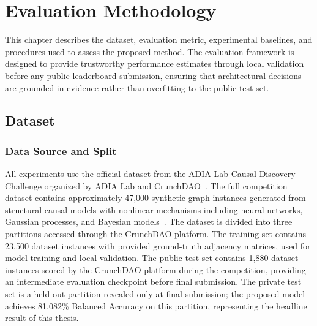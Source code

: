 \chapter{Evaluation Methodology}
\label{chap:eval}

This chapter describes the dataset, evaluation metric, experimental baselines, and procedures used to assess the proposed method. The evaluation framework is designed to provide trustworthy performance estimates through local validation before any public leaderboard submission, ensuring that architectural decisions are grounded in evidence rather than overfitting to the public test set.

\section{Dataset}
\label{sec:dataset}

\subsection{Data Source and Split}
\label{sec:data_source}

All experiments use the official dataset from the ADIA Lab Causal Discovery Challenge organized by ADIA Lab and CrunchDAO~\cite{crunchdao_adia_docs, crunchdao_causal_2024}. The full competition dataset contains approximately 47,000 synthetic graph instances generated from structural causal models with nonlinear mechanisms including neural networks, Gaussian processes, and Bayesian models~\cite{olivetti2025adialab}. The dataset is divided into three partitions accessed through the CrunchDAO platform. The training set contains 23,500 dataset instances with provided ground-truth adjacency matrices, used for model training and local validation. The public test set contains 1,880 dataset instances scored by the CrunchDAO platform during the competition, providing an intermediate evaluation checkpoint before final submission. The private test set is a held-out partition revealed only at final submission; the proposed model achieves 81.082\% Balanced Accuracy on this partition, representing the headline result of this thesis.


